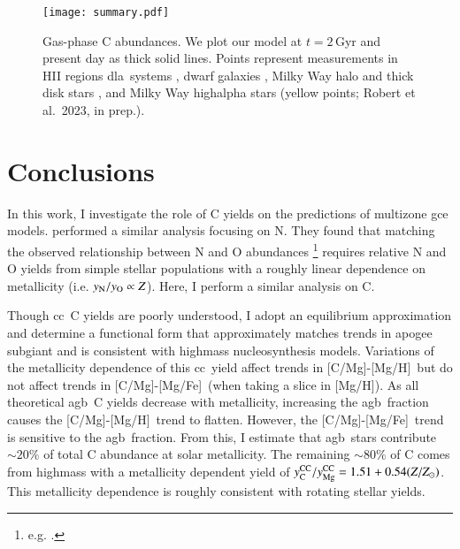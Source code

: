 \documentclass[12pt,oneside,letterpaper]{report}
\newcommand{\cc}{\gls{cc}}
\newcommand{\agb}{\gls{agb}}
\newcommand{\dla}{\gls{dla}}
\newcommand{\gce}{\gls{gce}}
\newcommand{\apogee}{\gls{apogee}}
\newcommand{\citealtjack}{Robert et al.~2023, in prep.}
\newcommand{\caah}{[C/Mg]-[Mg/H]}
\newcommand{\caafe}{[C/Mg]-[Mg/Fe]}
\newcommand{\Ycc}{\ensuremath{y_{\rm C}^{\rm CC}}}
\newcommand{\Yoc}{\ensuremath{y_{\rm Mg}^{\rm CC}}}
\newcommand{\about}[1]{${\sim} #1$}
\begin{document}
\begin{figure}[htp]
\centering
\texttt{[image: summary.pdf]}
\caption[Gas-Phase Abundances]{Gas-phase C abundances. We plot our model at $t=2$\,Gyr and present day as thick solid lines. Points represent measurements in 
    HII regions    \citep[pink circles;][]{skillman+20, esteban+02, esteban+09, esteban+14, esteban+19}
    \dla\ systems \citep[blue triangles;][]{ellison+10, srianand+10, dutta+14, DZ+03, pettini+08, morrison+16,cooke+17},  %
    dwarf galaxies \citep[red diamonds;][]{berg+19},
    Milky Way halo and thick disk stars \citep[green stars;][]{nissen+14, fabbian+09},
    and Milky Way \gls{highalpha} stars (yellow points; \citealtjack).
}
\label{fig:gas_phase}
\end{figure}


\chapter{Conclusions}

In this work, I investigate the role of C yields on the predictions of \gls{multizone} \gce{} models. \citet{james+23} performed a similar analysis focusing on N. They found that matching the observed relationship between N and O abundances%
\footnote{e.g. \citet{HEK00,PVT10,berg+12, berg+20, skillman+20, izotov+12, james2+15, dopita+16}.} requires relative N and O yields from simple stellar populations with a roughly linear dependence on metallicity (i.e. $y_{\rm N}/y_{\rm O} \propto Z$). 
Here, I perform a similar analysis on C. 

Though \cc\ C yields are poorly understood, I adopt an equilibrium approximation and determine a functional form that approximately matches trends in \apogee{} \gls{subgiant} and is consistent with \gls{highmass} \gls{nucleosynthesis} models. Variations of the metallicity dependence of this \cc\ yield affect trends in \caah~but do not affect trends in \caafe\ (when taking a slice in [Mg/H]). As all theoretical \agb\ C yields decrease with metallicity, increasing the \agb\ fraction causes the \caah\ trend to flatten. However, the \caafe\ trend is sensitive to the \agb\ fraction. 
From this, I estimate that \agb\ stars contribute \about{20\%} of total C abundance at solar metallicity. The remaining \about{80\%} of C comes from \gls{highmass} with a metallicity dependent yield of $\Ycc/\Yoc=1.51 + 0.54 (Z/Z_\odot)$. 
This metallicity dependence is roughly consistent with rotating stellar yields.
 
\end{document}
